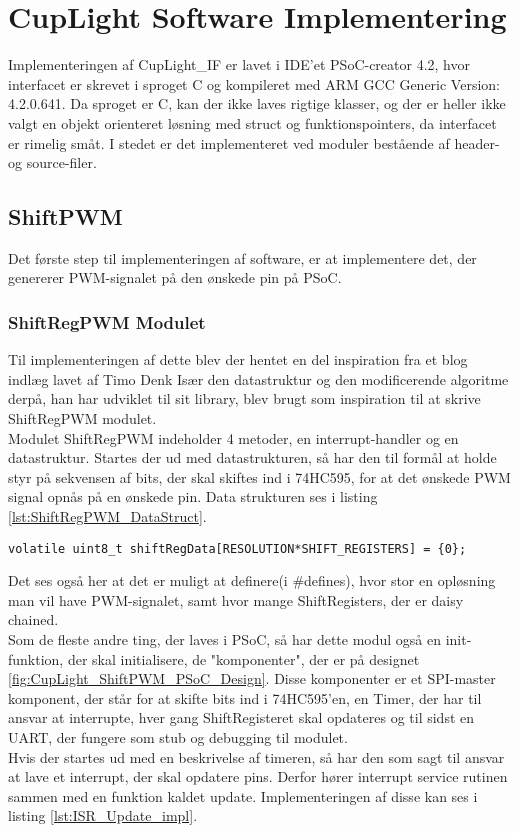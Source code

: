\documentclass[Softwaredesign/Softwaredesign_main.tex]{subfiles}
\begin{document}
\section{CupLight Software Implementering}\label{sec:cuplight_sw_impl}
Implementeringen af CupLight\_IF er lavet i IDE'et PSoC-creator 4.2, hvor interfacet er skrevet i sproget C og kompileret med ARM GCC Generic Version: 4.2.0.641. Da sproget er C, kan der ikke laves rigtige klasser, og der er heller ikke valgt en objekt orienteret løsning med struct og funktionspointers, da interfacet er rimelig småt. I stedet er det implementeret ved moduler bestående af header- og source-filer.
\subsection{ShiftPWM}
Det første step til implementeringen af software, er at implementere det, der genererer PWM-signalet på den ønskede pin på PSoC. 
\subsubsection{ShiftRegPWM Modulet}
Til implementeringen af dette blev der hentet en del inspiration fra et blog indlæg lavet af Timo Denk \cite{shiftregpwm} Især den datastruktur og den modificerende algoritme derpå,  han har udviklet til sit library, blev brugt som inspiration til at skrive ShiftRegPWM modulet. 
\\Modulet ShiftRegPWM indeholder 4 metoder, en interrupt-handler og en datastruktur. Startes der ud med datastrukturen, så har den  til formål at holde styr på sekvensen af bits, der skal skiftes ind i 74HC595, for at det ønskede PWM signal opnås på en ønskede pin. Data strukturen ses i listing \ref{lst:ShiftRegPWM_DataStruct}.

\begin{lstlisting}[caption={Datastruktur for ShiftRegPWM}, label={lst:ShiftRegPWM_DataStruct},
style=customc]
volatile uint8_t shiftRegData[RESOLUTION*SHIFT_REGISTERS] = {0};
\end{lstlisting}

Det ses også her at det er muligt at definere(i \#defines), hvor stor en opløsning man vil have PWM-signalet, samt hvor mange ShiftRegisters, der er daisy chained. 
\\Som de fleste andre ting, der laves i PSoC, så har dette modul også en init-funktion, der skal initialisere, de "komponenter", der er på designet \ref{fig:CupLight_ShiftPWM_PSoC_Design}. Disse komponenter er et SPI-master komponent, der står for at skifte bits ind i 74HC595'en, en Timer, der har til ansvar at interrupte, hver gang ShiftRegisteret skal opdateres og til sidst en UART, der fungere som stub og debugging til modulet.
\\Hvis der startes ud med en beskrivelse af timeren, så har den som sagt til ansvar at lave et interrupt, der skal opdatere pins. Derfor hører interrupt service rutinen sammen med en funktion kaldet update. Implementeringen af disse kan ses i listing \ref{lst:ISR_Update_impl}.
\end{document}
